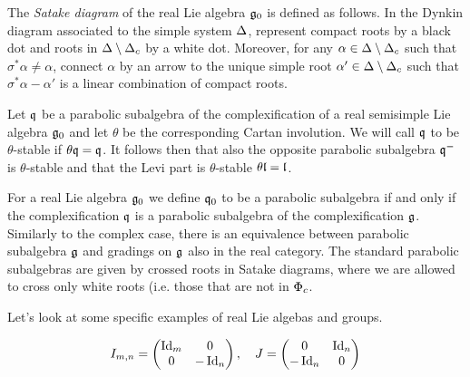 The \emph{Satake diagram} of the real Lie algebra $\mathfrak{g}_0$ is defined as follows. In the Dynkin diagram associated to the simple system $\Delta$, represent compact roots by a black dot and roots in $\Delta\setminus\Delta_c$ by a white dot. Moreover, for any $\alpha\in\Delta\setminus\Delta_c$ such that $\sigma^*\alpha\neq\alpha$, connect $\alpha$ by an arrow  to the unique simple root $\alpha'\in\Delta\setminus\Delta_c$ such that $\sigma^*\alpha -\alpha'$ is a linear combination of compact roots.




\begin{definition}
 Let $\mathfrak{q}$ be a parabolic subalgebra of the complexification of a real semisimple Lie algebra $\mathfrak{g}_0$ and let $\theta$ be the corresponding Cartan involution. We will call $\mathfrak{q}$ to be $\theta$-stable if $\theta \mathfrak{q} = \mathfrak{q}$. It follows then that also the opposite parabolic subalgebra $\mathfrak{q}^-$ is $\theta$-stable and that the Levi part is $\theta$-stable $\theta \mathfrak{l} = \mathfrak{l}$.
\end{definition}

For a real Lie algebra $\mathfrak{g}_0$ we define $\mathfrak{q}_0$ to be a parabolic subalgebra if and only if the complexification $\mathfrak{q}$ is a parabolic subalgebra of the complexification $\mathfrak{g}$. Similarly to the complex case, there is an equivalence between parabolic subalgebra $\mathfrak{g}$ and gradings on $\mathfrak{g}$ also in the real category. The standard parabolic subalgebras are given by crossed roots in Satake diagrams, where we are allowed to cross only white roots (i.e. those that are not in $\Phi_c$.


Let's look at some specific examples of real Lie algebas and groups.

\[
 I_{m,n} = \begin{pmatrix} \operatorname{\mathrm{Id}}_m & 0 \\ 0 & -\operatorname{\mathrm{Id}}_n \end{pmatrix}, \quad J = \begin{pmatrix} 0 & \operatorname{\mathrm{Id}}_n \\ -\operatorname{\mathrm{Id}}_n & 0 \end{pmatrix}
\]

